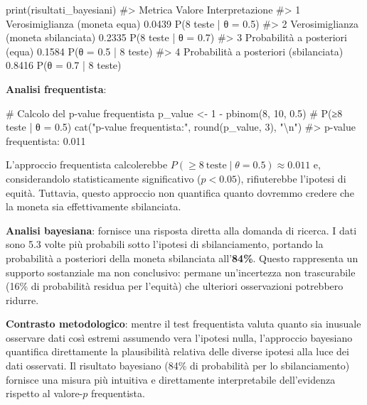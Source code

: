 \documentclass[
  letterpaper,
  DIV=11,
  numbers=noendperiod,
  oneside]{scrreprt}
\newenvironment{Shaded}{\begin{snugshade}}{\end{snugshade}}
\newcommand{\CommentTok}[1]{\textcolor[rgb]{0.37,0.37,0.37}{#1}}
\newcommand{\DecValTok}[1]{\textcolor[rgb]{0.68,0.00,0.00}{#1}}
\newcommand{\FloatTok}[1]{\textcolor[rgb]{0.68,0.00,0.00}{#1}}
\newcommand{\FunctionTok}[1]{\textcolor[rgb]{0.28,0.35,0.67}{#1}}
\newcommand{\NormalTok}[1]{\textcolor[rgb]{0.00,0.23,0.31}{#1}}
\newcommand{\OtherTok}[1]{\textcolor[rgb]{0.00,0.23,0.31}{#1}}
\newcommand{\SpecialCharTok}[1]{\textcolor[rgb]{0.37,0.37,0.37}{#1}}
\newcommand{\StringTok}[1]{\textcolor[rgb]{0.13,0.47,0.30}{#1}}
\theoremstyle{definition}
\theoremstyle{plain}
\theoremstyle{definition}
\theoremstyle{remark}
\begin{document}
\begin{tcolorbox}
\begin{Shaded}
\begin{Highlighting}[]
\FunctionTok{print}\NormalTok{(risultati\_bayesiani)}
\CommentTok{\#\textgreater{}                                  Metrica Valore      Interpretazione}
\CommentTok{\#\textgreater{} 1          Verosimiglianza (moneta equa) 0.0439 P(8 teste | θ = 0.5)}
\CommentTok{\#\textgreater{} 2   Verosimiglianza (moneta sbilanciata) 0.2335 P(8 teste | θ = 0.7)}
\CommentTok{\#\textgreater{} 3        Probabilità a posteriori (equa) 0.1584 P(θ = 0.5 | 8 teste)}
\CommentTok{\#\textgreater{} 4 Probabilità a posteriori (sbilanciata) 0.8416 P(θ = 0.7 | 8 teste)}
\end{Highlighting}
\end{Shaded}

\textbf{Analisi frequentista}:

\begin{Shaded}
\begin{Highlighting}[]
\CommentTok{\# Calcolo del p{-}value frequentista}
\NormalTok{p\_value }\OtherTok{\textless{}{-}} \DecValTok{1} \SpecialCharTok{{-}} \FunctionTok{pbinom}\NormalTok{(}\DecValTok{8}\NormalTok{, }\DecValTok{10}\NormalTok{, }\FloatTok{0.5}\NormalTok{)  }\CommentTok{\# P(≥8 teste | θ = 0.5)}
\FunctionTok{cat}\NormalTok{(}\StringTok{"p{-}value frequentista:"}\NormalTok{, }\FunctionTok{round}\NormalTok{(p\_value, }\DecValTok{3}\NormalTok{), }\StringTok{"}\SpecialCharTok{\textbackslash{}n}\StringTok{"}\NormalTok{)}
\CommentTok{\#\textgreater{} p{-}value frequentista: 0.011}
\end{Highlighting}
\end{Shaded}

L'approccio frequentista calcolerebbe
\(P(\geq 8\ \text{teste} \mid \theta = 0.5) \approx 0.011\) e,
considerandolo statisticamente significativo (\(p < 0.05\)),
rifiuterebbe l'ipotesi di equità. Tuttavia, questo approccio non
quantifica quanto dovremmo credere che la moneta sia effettivamente
sbilanciata.

\textbf{Analisi bayesiana}: fornisce una risposta diretta alla domanda
di ricerca. I dati sono 5.3 volte più probabili sotto l'ipotesi di
sbilanciamento, portando la probabilità a posteriori della moneta
sbilanciata all'\textbf{84\%}. Questo rappresenta un supporto
sostanziale ma non conclusivo: permane un'incertezza non trascurabile
(16\% di probabilità residua per l'equità) che ulteriori osservazioni
potrebbero ridurre.

\textbf{Contrasto metodologico}: mentre il test frequentista valuta
quanto sia inusuale osservare dati così estremi assumendo vera l'ipotesi
nulla, l'approccio bayesiano quantifica direttamente la plausibilità
relativa delle diverse ipotesi alla luce dei dati osservati. Il
risultato bayesiano (84\% di probabilità per lo sbilanciamento) fornisce
una misura più intuitiva e direttamente interpretabile dell'evidenza
rispetto al valore-\(p\) frequentista.

\end{tcolorbox}
\end{document}
